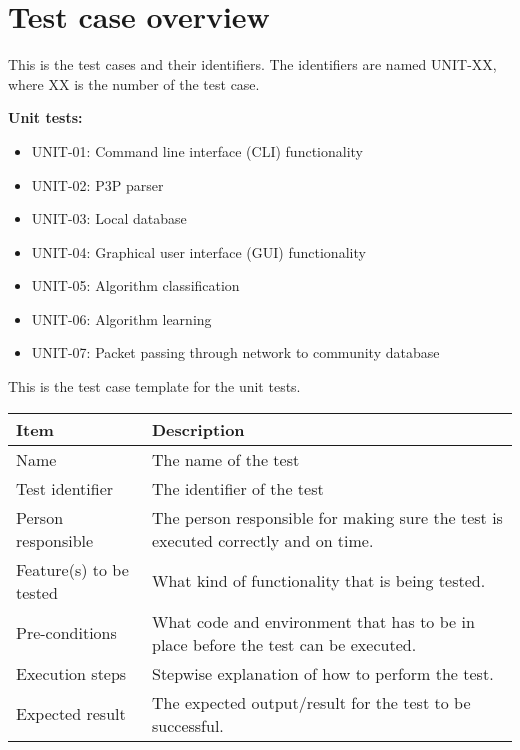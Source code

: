 	\section{Test case overview}
		This is the test cases and their identifiers. The identifiers are named UNIT-XX, where XX is the number of the test case.
		\vspace{8 mm}
		
		\textbf{Unit tests:}
		\begin{itemize}
			\renewcommand{\labelitemi}{$\bullet$}
				\item UNIT-01: Command line interface (CLI) functionality
				\item UNIT-02: P3P parser
				\item UNIT-03: Local database
				\item UNIT-04: Graphical user interface (GUI) functionality
				\item UNIT-05: Algorithm classification
				\item UNIT-06: Algorithm learning
				\item UNIT-07: Packet passing through network to community database
		\end{itemize}

		\vspace{8 mm}
		This is the test case template for the unit tests.
		\vspace{8 mm}

		\begin{center}
			\begin{tabular}{ |  p{4cm} | p{10cm} | }
				\hline
				Item & Description \\ [3pt] \hline \hline
				Name & The name of the test \\  [3pt] \hline
				Test identifier & The identifier of the test \\  [3pt] \hline
				Person responsible & The person responsible for making sure the test is executed correctly and on time. \\  [3pt] \hline
				Feature(s) to be tested & What kind of functionality that is being tested. \\  [3pt] \hline
				Pre-conditions & What code and environment that has to be in place before the test can be executed. \\  [3pt] \hline
				Execution steps & Stepwise explanation of how to perform the test. \\  [3pt] \hline
				Expected result & The expected output/result for the test to be successful. \\  [3pt] \hline
			\end{tabular}
		\end{center}

